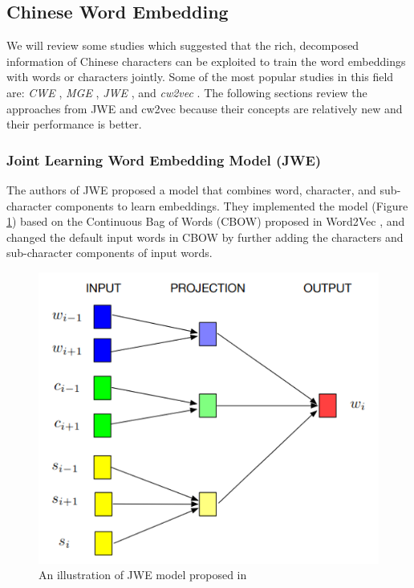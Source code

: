 \subsection{Chinese Word Embedding} \label{sec:rw_cwe}

We will review some studies which suggested that the rich, decomposed information of Chinese characters can be exploited to train the word embeddings with words or characters jointly. Some of the most popular studies in this field are: \textit{CWE} \cite{chen2015joint}, \textit{MGE} \cite{yin2016multi}, \textit{JWE} \cite{yu2017joint}, and \textit{cw2vec} \cite{cao2018cw2vec}. The following sections review the approaches from JWE and cw2vec because their concepts are relatively new and their performance is better.

\subsubsection{Joint Learning Word Embedding Model (JWE)}

The authors of JWE \cite{yu2017joint} proposed a model that combines word, character, and sub-character components to learn embeddings. They implemented the model (Figure \ref{fig:jwe}) based on the Continuous Bag of Words (CBOW) proposed in Word2Vec \cite{mikolov2013efficient}, and changed the default input words in CBOW by further adding the characters and sub-character components of input words.

\begin{figure}[h]
	\centering
	\includegraphics[scale=0.7]{../images/jwe_illustration.png}
	\caption{An illustration of JWE model proposed in \cite{yu2017joint}}
	\label{fig:jwe}
\end{figure}

